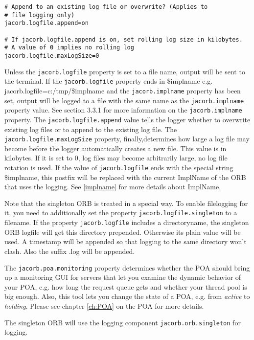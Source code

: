 {{{\begin{verbatim}
# Append to an existing log file or overwrite? (Applies to
# file logging only)
jacorb.logfile.append=on

# If jacorb.logfile.append is on, set rolling log size in kilobytes.
# A value of 0 implies no rolling log
jacorb.logfile.maxLogSize=0
\end{verbatim}
}
\renewcommand{\baselinestretch}{1.0}
\small\normalsize

Unless the {\tt jacorb.logfile} property is set to a file name, output
will be sent to the terminal. If the {\tt jacorb.logfile} property ends in
\$implname e.g. jacorb.logfile=c:/tmp/\$implname
 and the {\tt jacorb.implname} property has been set, output will be logged
to a file with the same name as the {\tt jacorb.implname} property value. See
section 3.3.1 for more information on the {\tt jacorb.implname} property.
The {\tt jacorb.logfile.append} value tells the logger whether to overwrite
existing log files or to append to the existing log file.
The {\tt jacorb.logfile.maxLogSize} property, finally,determines how large a log file may become before the logger
automatically creates a new file. This value is in kilobytes. If it is
set to 0, log files may become arbitrarily large, no log file rotation
is used. If the value of {\tt jacorb.logfile} ends with the special string \$implname,
this postfix will be replaced with the current ImplName of the ORB that
uses the logging. See \ref{implname} for more details about ImplName.

Note that the singleton ORB is treated in a special way. To enable filelogging for it,
you need to additionally set the property {\tt jacorb.logfile.singleton} to a filename.
If the property {\tt jacorb.logfile} includes a directoryname, the singleton ORB logfile
will get this directory prepended. Otherwise its plain value will be used. A timestamp will be
appended so that logging to the same directory won't clash. Also the suffix .log will be appended.

The  {\tt jacorb.poa.monitoring} property  determines whether  the POA
should bring up a monitoring GUI  for servers that let you examine the
dynamic behavior of  your POA, e.g.  how long  the request queue gets
and whether your thread pool is  big enough.  Also, this tool lets you
change the  state of a POA,  e.g. from {\it active}  to {\it holding}.
Please see chapter \ref{ch:POA} on the POA for more details.

The singleton ORB will use the logging component {\tt jacorb.orb.singleton} for
logging.

}}
